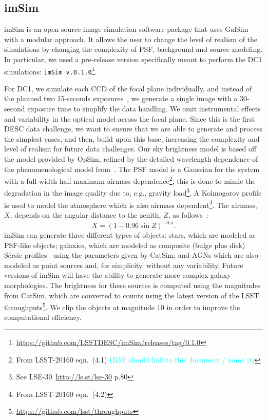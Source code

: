 \documentclass[twocolumn]{aastex62}
\newcommand{\rachel}[1]{{\textcolor{cyan}{{\textbf (RM: #1)}}}}
\begin{document}
\subsection{imSim}
\label{sec:imsim_pipeline}

imSim is an open-source image simulation software package that uses GalSim with a modular approach. It allows the user to change the level of realism of the simulations by changing the complexity of PSF, background and source modeling. In particular, we used a pre-release version specifically meant to perform the DC1 simulations: \texttt{imSim v.0.1.0}\footnote{\url{https://github.com/LSSTDESC/imSim/releases/tag/0.1.0}}.

For DC1, we simulate each CCD of the focal plane individually, and instead of the planned two 15-seconds exposures~\citep{Overview}, we generate a single image with a 30-second exposure time to simplify the data handling. We omit instrumental effects and variability in the optical model across the focal plane. Since this is the first DESC data challenge, we want to ensure that we are able to generate and process the simplest cases, and then, build upon this base, increasing the complexity and level of realism for future data challenges. Our sky brightness model is based off the \citet{1991PASP..103.1033K} model provided by OpSim, refined by the detailed wavelength dependence of the phenomenological model from~\citet{2016SPIE.9910E..1AY}. The PSF model is a Gaussian for the system with a full-width half-maximum airmass dependence\footnote{From LSST-20160 eqn.~(4.1) \rachel{should link to this document / name it}}, this is done to mimic the degradation in the image quality due to, e.g., gravity load\footnote{See LSE-30~\url{http://ls.st/lse-30} p.80}. A Kolmogorov profile is used to model the atmosphere which is also airmass dependent\footnote{From LSST-20160 eqn.~(4.2)}. The airmass, $X$, depends on the angular distance to the zenith, $Z$, as follows~\citep{1991PASP..103.1033K}:
\begin{equation}
X = (1 - 0.96\sin{Z})^{-0.5}.
\end{equation}
imSim can generate three different types of objects: stars, which are modeled as PSF-like objects; galaxies, which are modeled as composite (bulge plus disk) S\'{e}rsic profiles~\citep{1963BAAA....6...41S} using
the parameters given by CatSim; and AGNs which are also modeled as point sources and, for simplicity, without any variability. Future versions of imSim will have the ability to generate more complex galaxy morphologies. The brightness for these sources is computed using the magnitudes from CatSim, which are converted to counts using the latest version of the LSST throughputs\footnote{\url{https://github.com/lsst/throughputs}}. We clip the objects at magnitude 10 in order to improve the computational efficiency.
\end{document}
